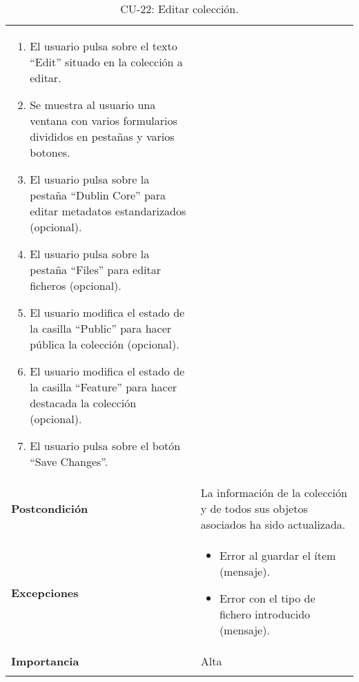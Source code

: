 \begin{longtable}[]{@{}ll@{}}
\begin{minipage}[t]{0.75\columnwidth}
\begin{enumerate}
\tightlist
\item
  El usuario pulsa sobre el texto ``Edit'' situado en la colección a
  editar.
\item
  Se muestra al usuario una ventana con varios formularios divididos en
  pestañas y varios botones.
\item
  El usuario pulsa sobre la pestaña ``Dublin Core'' para editar metadatos
  estandarizados (opcional).
\item
  El usuario pulsa sobre la pestaña ``Files'' para editar ficheros
  (opcional).
\item
  El usuario modifica el estado de la casilla ``Public'' para hacer
  pública la colección (opcional).
\item
  El usuario modifica el estado de la casilla ``Feature'' para hacer
  destacada la colección (opcional).
\item
  El usuario pulsa sobre el botón ``Save Changes''.
\end{enumerate}\strut
\end{minipage}\tabularnewline
\begin{minipage}[t]{0.19\columnwidth}\raggedright
\textbf{Postcondición}\strut
\end{minipage} & \begin{minipage}[t]{0.75\columnwidth}\raggedright
La información de la colección y de todos sus objetos asociados ha sido
actualizada.\strut
\end{minipage}\tabularnewline
\begin{minipage}[t]{0.19\columnwidth}\raggedright
\textbf{Excepciones}\strut
\end{minipage} & \begin{minipage}[t]{0.75\columnwidth}\raggedright
\begin{itemize}
\tightlist
\item
  Error al guardar el ítem (mensaje).
\item
  Error con el tipo de fichero introducido (mensaje).
\end{itemize}\strut
\end{minipage}\tabularnewline
\begin{minipage}[t]{0.19\columnwidth}\raggedright
\textbf{Importancia}\strut
\end{minipage} & \begin{minipage}[t]{0.75\columnwidth}\raggedright
Alta\strut
\end{minipage}\tabularnewline
\bottomrule
\caption{CU-22: Editar colección.}
\end{longtable}

